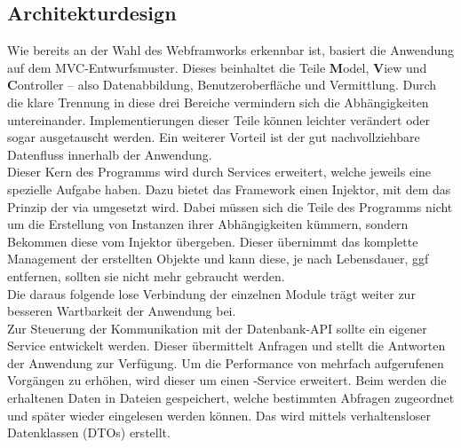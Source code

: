 \subsection{Architekturdesign}
\label{sec:Architekturdesign}
Wie bereits an der Wahl des Webframworks erkennbar ist, basiert die Anwendung auf dem \acs{MVC}-Entwurfsmuster.
Dieses beinhaltet die Teile \textbf{M}odel, \textbf{V}iew und \textbf{C}ontroller -- also Datenabbildung, 
Benutzeroberfläche und Vermittlung. Durch die klare Trennung in diese drei Bereiche vermindern sich
die Abhängigkeiten untereinander. Implementierungen dieser Teile können leichter verändert oder sogar ausgetauscht werden.
Ein weiterer Vorteil ist der gut nachvollziehbare Datenfluss innerhalb der Anwendung.\\
Dieser Kern des Programms wird durch Services erweitert, welche jeweils eine spezielle Aufgabe haben.
Dazu bietet das Framework einen Injektor, mit dem das Prinzip der  via 
 umgesetzt wird. Dabei müssen sich die Teile des Programms nicht um die Erstellung von
Instanzen ihrer Abhängigkeiten kümmern, sondern Bekommen diese vom Injektor übergeben. Dieser übernimmt
das komplette Management der erstellten Objekte und kann diese, je nach Lebensdauer, \acs{ggf} entfernen, sollten sie nicht mehr 
gebraucht werden. \\Die daraus folgende lose Verbindung der einzelnen Module trägt weiter zur besseren Wartbarkeit der Anwendung bei.\\
Zur Steuerung der Kommunikation mit der Datenbank-API sollte ein eigener Service entwickelt werden. Dieser übermittelt
Anfragen und stellt die Antworten der Anwendung zur Verfügung. Um die Performance von
mehrfach aufgerufenen Vorgängen zu erhöhen, wird dieser um einen -Service erweitert.
Beim  werden die erhaltenen Daten in Dateien gespeichert, welche bestimmten Abfragen
zugeordnet und später wieder eingelesen werden können.
Das  wird mittels verhaltensloser Datenklassen (\acs{DTO}s) erstellt. 

